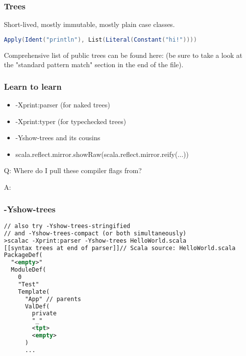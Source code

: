 \documentclass[hyperref={bookmarks=false}]{beamer}
\begin{document}
\begin{frame}[fragile]
\frametitle{Trees}

Short-lived, mostly immutable, mostly plain case classes.

\begin{lstlisting}[language=Scala]
Apply(Ident("println"), List(Literal(Constant("hi!"))))
\end{lstlisting}

Comprehensive list of public trees can be found here:
(be sure to take a look at the "standard pattern match" section in the end of the file).

\end{frame}

\begin{frame}[fragile]
\frametitle{Learn to learn}

\begin{itemize}
\item -Xprint:parser (for naked trees)
\item -Xprint:typer (for typechecked trees)
\item -Yshow-trees and its cousins
\item scala.reflect.mirror.showRaw(scala.reflect.mirror.reify(...))
\end{itemize}

Q: Where do I pull these compiler flags from?

A: 

\end{frame}

\begin{frame}[fragile]
\frametitle{-Yshow-trees}

\begin{lstlisting}[language=XML]
// also try -Yshow-trees-stringified
// and -Yshow-trees-compact (or both simultaneously)
>scalac -Xprint:parser -Yshow-trees HelloWorld.scala
[[syntax trees at end of parser]]// Scala source: HelloWorld.scala
PackageDef(
  "<empty>"
  ModuleDef(
    0
    "Test"
    Template(
      "App" // parents
      ValDef(
        private
        "_"
        <tpt>
        <empty>
      )
      ...
\end{lstlisting}

\end{frame}
\end{document}
